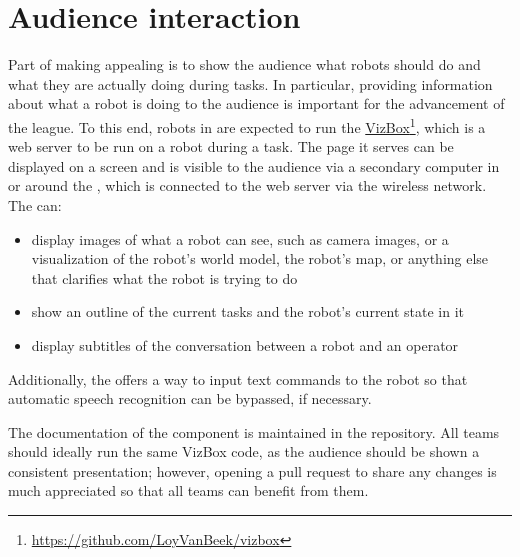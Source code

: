 \section{Audience interaction}
\label{rule:vizbox}

Part of making \RoboCup\AtHome{} appealing is to show the audience what robots should do and what they are actually doing during tasks.
In particular, providing information about what a robot is doing to the audience is important for the advancement of the league.
To this end, robots in \AtHome{} are expected to run the \RoboCup\AtHome{} \href{https://github.com/LoyVanBeek/vizbox}{VizBox}\footnote{\url{https://github.com/LoyVanBeek/vizbox}}, which is a web server to be run on a robot during a task.
The page it serves can be displayed on a screen and is visible to the audience via a secondary computer in or around the \Arena{}, which is connected to the web server via the wireless network.
The  can:
\begin{itemize}
	\item display images of what a robot can see, such as camera images, or a visualization of the robot's world model, the robot's map, or anything else that clarifies what the robot is trying to do
	\item show an outline of the current tasks and the robot's current state in it
	\item display subtitles of the conversation between a robot and an operator
\end{itemize}
Additionally, the  offers a way to input text commands to the robot so that automatic speech recognition can be bypassed, if necessary.

The documentation of the component is maintained in the  repository.
All teams should ideally run the same VizBox code, as the audience should be shown a consistent presentation; however, opening a pull request to share any changes is much appreciated so that all teams can benefit from them.
